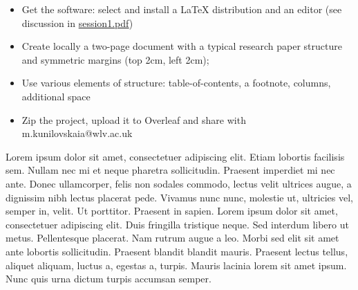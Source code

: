 \documentclass[a4paper,12pt]{article}
\begin{document}
	

\begin{itemize}
	\item Get the software: select and install a LaTeX distribution and an editor (see discussion in \href{https://canvas.wlv.ac.uk/courses/33429/files/folder/latex_mendeley_github/w1-3_latex?preview=4622172}{session1.pdf})
	\item Create locally a two-page document with a typical research paper structure and symmetric margins (top 2cm, left 2cm); 
	\item Use various elements of structure: table-of-contents, a footnote, columns, additional space 
	\item Zip the project, upload it to Overleaf and share with m.kunilovskaia@wlv.ac.uk
\end{itemize}
	

Lorem ipsum dolor sit amet, consectetuer adipiscing elit. Etiam lobortis facilisis sem. Nullam nec mi et neque pharetra sollicitudin. Praesent imperdiet mi nec ante. Donec ullamcorper, felis non sodales commodo, lectus velit ultrices augue, a dignissim nibh lectus placerat pede. Vivamus nunc nunc, molestie ut, ultricies vel, semper in, velit. Ut porttitor. Praesent in sapien. Lorem ipsum dolor sit amet, consectetuer adipiscing elit. Duis fringilla tristique neque. Sed interdum libero ut metus. Pellentesque placerat. Nam rutrum augue a leo. Morbi sed elit sit amet ante lobortis sollicitudin. Praesent blandit blandit mauris. Praesent lectus tellus, aliquet aliquam, luctus a, egestas a, turpis. Mauris lacinia lorem sit amet ipsum. Nunc quis urna dictum turpis accumsan semper.
\end{document}
